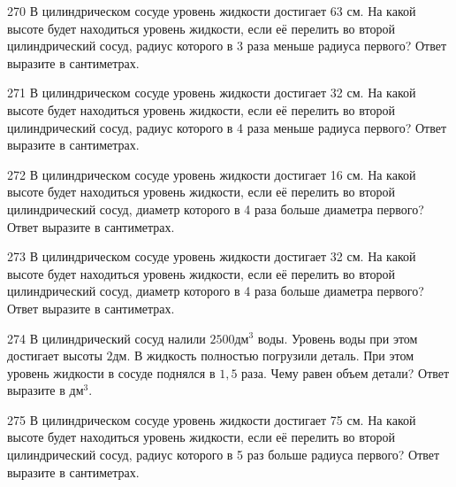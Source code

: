 \documentclass[4apaper]{article}
\begin{document}
\begin{taskBN}{270}
В цилиндрическом сосуде уровень жидкости достигает 63 см. На какой высоте будет находиться уровень жидкости, если её перелить во второй цилиндрический сосуд, радиус которого в 3 раза меньше радиуса первого? Ответ выразите в сантиметрах.
\end{taskBN}

\begin{taskBN}{271}
В цилиндрическом сосуде уровень жидкости достигает 32 см. На какой высоте будет находиться уровень жидкости, если её перелить во второй цилиндрический сосуд, радиус которого в 4 раза меньше радиуса первого? Ответ выразите в сантиметрах.
\end{taskBN}

\begin{taskBN}{272}
В цилиндрическом сосуде уровень жидкости достигает 16 см. На какой высоте будет находиться уровень жидкости, если её перелить во второй цилиндрический сосуд, диаметр которого в 4 раза больше диаметра первого? Ответ выразите в сантиметрах.
\end{taskBN}

\begin{taskBN}{273}
В цилиндрическом сосуде уровень жидкости достигает 32 см. На какой высоте будет находиться уровень жидкости, если её перелить во второй цилиндрический сосуд, диаметр которого в 4 раза больше диаметра первого? Ответ выразите в сантиметрах.
\end{taskBN}

\begin{taskBN}{274}
В цилиндрический сосуд налили $2500\mbox{дм}^3$ воды. Уровень воды при этом достигает высоты $2$дм. В жидкость полностью погрузили деталь. При этом уровень жидкости в сосуде поднялся в $ 1{,}5 $ раза. Чему равен объем детали? Ответ выразите в $\mbox{дм}^3$.
\end{taskBN}

\begin{taskBN}{275}
В цилиндрическом сосуде уровень жидкости достигает 75 см. На какой высоте будет находиться уровень жидкости, если её перелить во второй цилиндрический сосуд, радиус которого в 5 раз больше радиуса первого? Ответ выразите в сантиметрах.
\end{taskBN}
\end{document}
